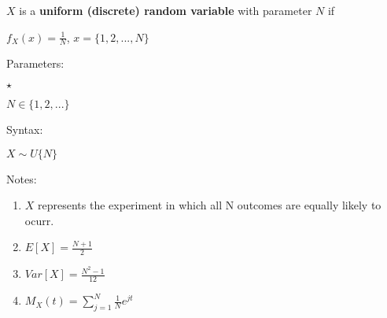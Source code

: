 \documentclass[12pt]{article}
\begin{document}
$X$ is a \textbf{uniform (discrete) random variable} with parameter \textbf{$N$} if\\
\par
$f_X(x) = \frac{1}{N}$,     $x=\{1,2,...,N\}$	\\
\par
Parameters:\\
\par
\begin{list}{$\star$ }{}
\item $N \in \{1,2,...\}$
\end{list}
\par
Syntax:\\
\par
$X\sim U\{N\}$\\
\par
Notes:\\
\par
\begin{enumerate}

\item $X$ represents the experiment in which all N outcomes are equally likely to ocurr.
\item $E[X] = \frac{N+1}{2}$
\item $Var[X] = \frac{N^2-1}{12}$
\item $M_X(t) = \sum_{j=1}^{N}{\frac{1}{N} e^{jt}}$

\end{enumerate}
\end{document}

